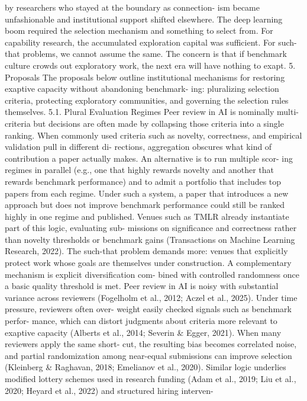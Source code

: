 by researchers who stayed at the boundary as connection-
ism became unfashionable and institutional support shifted
elsewhere. The deep learning boom required the selection
mechanism and something to select from. For capability
research, the accumulated exploration capital was sufficient.
For such-that problems, we cannot assume the same. The
concern is that if benchmark culture crowds out exploratory
work, the next era will have nothing to exapt.
5. Proposals
The proposals below outline institutional mechanisms for
restoring exaptive capacity without abandoning benchmark-
ing: pluralizing selection criteria, protecting exploratory
communities, and governing the selection rules themselves.
5.1. Plural Evaluation Regimes
Peer review in AI is nominally multi-criteria but decisions
are often made by collapsing those criteria into a single
ranking. When commonly used criteria such as novelty,
correctness, and empirical validation pull in different di-
rections, aggregation obscures what kind of contribution a
paper actually makes. An alternative is to run multiple scor-
ing regimes in parallel (e.g., one that highly rewards novelty
and another that rewards benchmark performance) and to
admit a portfolio that includes top papers from each regime.
Under such a system, a paper that introduces a new approach
but does not improve benchmark performance could still be
ranked highly in one regime and published. Venues such as
TMLR already instantiate part of this logic, evaluating sub-
missions on significance and correctness rather than novelty
thresholds or benchmark gains (Transactions on Machine
Learning Research, 2022). The such-that problem demands
more: venues that explicitly protect work whose goals are
themselves under construction.
A complementary mechanism is explicit diversification com-
bined with controlled randomness once a basic quality
threshold is met. Peer review in AI is noisy with substantial
variance across reviewers (Fogelholm et al., 2012; Aczel
et al., 2025). Under time pressure, reviewers often over-
weight easily checked signals such as benchmark perfor-
mance, which can distort judgments about criteria more
relevant to exaptive capacity (Alberts et al., 2014; Severin \&
Egger, 2021). When many reviewers apply the same short-
cut, the resulting bias becomes correlated noise, and partial
randomization among near-equal submissions can improve
selection (Kleinberg \& Raghavan, 2018; Emelianov et al.,
2020). Similar logic underlies modified lottery schemes
used in research funding (Adam et al., 2019; Liu et al.,
2020; Heyard et al., 2022) and structured hiring interven-
